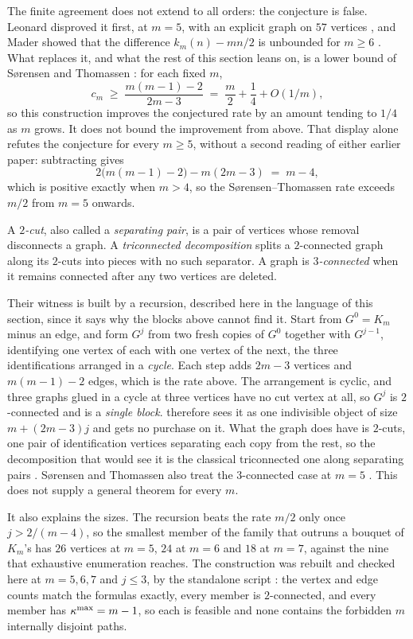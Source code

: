 The finite agreement does not extend to all orders: the conjecture is false. Leonard disproved it first, at $m = 5$, with an explicit graph on $57$ vertices \cite{Leonard73BE}, and Mader showed that the difference $k_m(n) - mn/2$ is unbounded for $m \ge 6$ \cite{Mader73}. What replaces it, and what the rest of this section leans on, is a lower bound of S\o{}rensen and Thomassen \cite{SorensenThomassen74}: for each fixed $m$,
\[
    c_m \;\ge\; \frac{m(m-1)-2}{2m-3} \;=\; \frac{m}{2} + \frac{1}{4} + O(1/m) ,
\]
so this construction improves the conjectured rate by an amount tending to $1/4$ as $m$ grows. It does not bound the improvement from above. That display alone refutes the conjecture for every $m \ge 5$, without a second reading of either earlier paper: subtracting gives
\[
    2\bigl(m(m-1)-2\bigr) - m(2m-3) \;=\; m-4 ,
\]
which is positive exactly when $m > 4$, so the S\o{}rensen--Thomassen rate exceeds $m/2$ from $m = 5$ onwards.

A \emph{$2$-cut}, also called a \emph{separating pair}, is a pair of vertices
whose removal disconnects a graph. A
\emph{triconnected decomposition} splits a $2$-connected graph along its
$2$-cuts into pieces with no such separator. A graph is \emph{$3$-connected}
when it remains connected after any two vertices are deleted.

Their witness is built by a recursion, described here in the language of this section, since it says why the blocks above cannot find it. Start from $G^0 = K_m$ minus an edge, and form $G^{j}$ from two fresh copies of $G^0$ together with $G^{j-1}$, identifying one vertex of each with one vertex of the next, the three identifications arranged in a \emph{cycle}. Each step adds $2m-3$ vertices and $m(m-1)-2$ edges, which is the rate above. The arrangement is cyclic, and three graphs glued in a cycle at three vertices have no cut vertex at all, so $G^{j}$ is $2$-connected and is a \emph{single block}.  therefore sees it as one indivisible object of size $m + (2m-3)j$ and gets no purchase on it. What the graph does have is $2$-cuts, one pair of identification vertices separating each copy from the rest, so the decomposition that would see it is the classical triconnected one along separating pairs \cite{Tutte66,HopcroftTarjan73}. S\o{}rensen and Thomassen also treat the $3$-connected case at $m=5$ \cite{SorensenThomassen74}. This does not supply a general theorem for every $m$.

It also explains the sizes. The recursion beats the rate $m/2$ only once $j > 2/(m-4)$, so the smallest member of the family that outruns a bouquet of $K_m$'s has $26$ vertices at $m = 5$, $24$ at $m = 6$ and $18$ at $m = 7$, against the nine that exhaustive enumeration reaches. The construction was rebuilt and checked here at $m = 5, 6, 7$ and $j \le 3$, by the standalone script : the vertex and edge counts match the formulas exactly, every member is $2$-connected, and every member has $\kappa^{\max} = m-1$, so each is feasible and none contains the forbidden $m$ internally disjoint paths.

